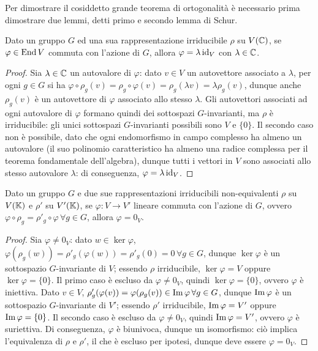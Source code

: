 Per dimostrare il cosiddetto grande teorema di ortogonalità è necessario prima dimostrare due lemmi, detti primo e secondo lemma di Schur.

\begin{lemma}[Schur]
	Dato un gruppo $ G $ ed una sua rappresentazione irriducibile $ \rho $ su $ V(\mathbb{C}) $, se $ \varphi \in \operatorname{End} V $ commuta con l'azione di $ G $, allora $ \varphi = \lambda \operatorname{id}_V $ con $ \lambda \in \mathbb{C} $.
\end{lemma}
\begin{proof}
	Sia $ \lambda \in \mathbb{C} $ un autovalore di $ \varphi $: dato $ v \in V $ un autovettore associato a $ \lambda $, per ogni $ g \in G $ si ha $ \varphi \circ \rho_g(v) = \rho_g \circ \varphi(v) = \rho_g(\lambda v) = \lambda \rho_g(v) $, dunque anche $ \rho_g(v) $ è un autovettore di $ \varphi $ associato allo stesso $ \lambda $.
	Gli autovettori associati ad ogni autovalore di $ \varphi $ formano quindi dei sottospazi $ G $-invarianti, ma $ \rho $ è irriducibile: gli unici sottospazi $ G $-invarianti possibili sono $ V $ e $ \{0\} $. Il secondo caso non è possibile, dato che ogni endomorfismo  in campo complesso ha almeno un autovalore (il suo polinomio caratteristico ha almeno una radice complessa per il teorema fondamentale dell'algebra), dunque tutti i vettori in $ V $ sono associati allo stesso autovalore $ \lambda $: di conseguenza, $ \varphi = \lambda \operatorname{id}_V $.
\end{proof}

\begin{lemma}[Schur]
	Dato un gruppo $ G $ e due sue rappresentazioni irriducibili non-equivalenti $ \rho $ su $ V(\mathbb{K}) $ e $ \rho' $ su $ V'(\mathbb{K}) $, se $ \varphi : V \rightarrow V' $ lineare commuta con l'azione di $ G $, ovvero $ \varphi \circ \rho_g = \rho'_g \circ \varphi \,\forall g \in G $, allora $ \varphi = 0_V $.
\end{lemma}
\begin{proof}
	Sia $ \varphi \neq 0_V $: dato $ w \in \ker \varphi $, $ \varphi(\rho_g(w)) = \rho'_g(\varphi(w)) = \rho'_g(0) = 0 \,\forall g \in G $, dunque $ \ker \varphi $ è un sottospazio $ G $-invariante di $ V $; essendo $ \rho $ irriducibile, $ \ker \varphi = V $ oppure $ \ker \varphi = \{0\} $. Il primo caso è escluso da $ \varphi \neq 0_V $, quindi $ \ker \varphi = \{0\} $, ovvero $ \varphi $ è iniettiva. Dato $ v \in V $, $ \rho'_g(\varphi(v)) = \varphi(\rho_g(v)) \in \operatorname{Im} \varphi \,\forall g \in G $, dunque $ \operatorname{Im} \varphi $ è un sottospazio $ G $-invariante di $ V' $; essendo $ \rho' $ irriducibile, $ \operatorname{Im} \varphi = V' $ oppure $ \operatorname{Im} \varphi = \{0\} $. Il secondo caso è escluso da $ \varphi \neq 0_V $, quindi $ \operatorname{Im} \varphi = V' $, ovvero $ \varphi $ è suriettiva. Di conseguenza, $ \varphi $ è biunivoca, dunque un isomorfismo: ciò implica l'equivalenza di $ \rho $ e $ \rho' $, il che è escluso per ipotesi, dunque deve essere $ \varphi = 0_V $.
\end{proof}

